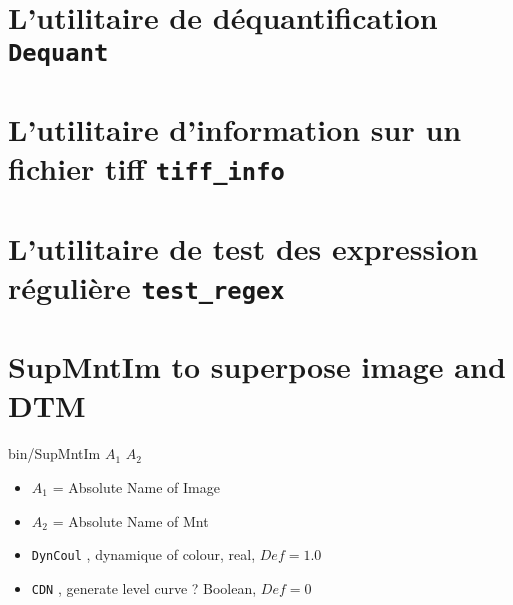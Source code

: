 \section{L'utilitaire de d\'equantification  {\tt Dequant}}


\section{L'utilitaire d'information sur un fichier tiff {\tt tiff\_info}}



\section{L'utilitaire  de test des expression r\'eguli\`ere {\tt test\_regex}}




\section{SupMntIm to superpose image and DTM}


bin/SupMntIm $A_1$ $A_2$

\begin{itemize}
    \item $A_1$ = Absolute Name of Image
    \item $A_2$ = Absolute Name of Mnt
    \item {\tt DynCoul} , dynamique of colour, real, $Def=1.0$
    \item {\tt CDN} , generate level curve ?  Boolean, $Def=0$
\end{itemize}







